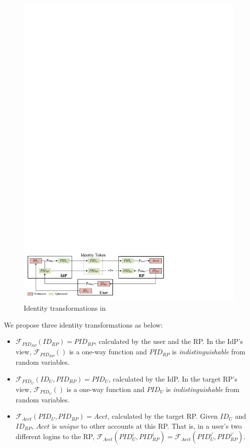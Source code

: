 \begin{figure}[bt]
  \centering
  \includegraphics[width=0.99\linewidth]{fig/IDCorrelation.pdf}
  \caption{Identity transformations in \usso} %
  \label{fig:IDCorrelation}
\end{figure}

We propose three identity transformations as below:
\vspace{-\topsep}\begin{itemize}
\setlength{\topsep}{0pt}
\setlength{\partopsep}{0pt}
\setlength{\itemsep}{0pt}
\setlength{\parsep}{0pt}
\setlength{\parskip}{0pt}
\item
$\mathcal{F}_{PID_{RP}}(ID_{RP}) = PID_{RP}$, calculated by the user and the RP.
In the IdP's view,
$\mathcal{F}_{PID_{RP}}()$ is a one-way function and $PID_{RP}$
is \emph{indistinguishable} from random variables.
\item
$\mathcal{F}_{PID_U}(ID_U, PID_{RP}) = PID_{U}$, calculated by the IdP.
In the target RP's view,
    $\mathcal{F}_{PID_U}()$ is a one-way function and $PID_{U}$ is \emph{indistinguishable} from random variables.
\item
$\mathcal{F}_{Acct}(PID_{U}, PID_{RP}) = Acct$, calculated by the target RP.
Given $ID_U$ and $ID_{RP}$, $Acct$ is %
\emph{unique} to other accounts at this RP.
That is, in a user's two different logins to the RP,
 $\mathcal{F}_{Acct}(PID_{U}^i, PID_{RP}^i) = \mathcal{F}_{Acct}(PID_{U}^{i'}, PID_{RP}^{i'})$.
\end{itemize}



